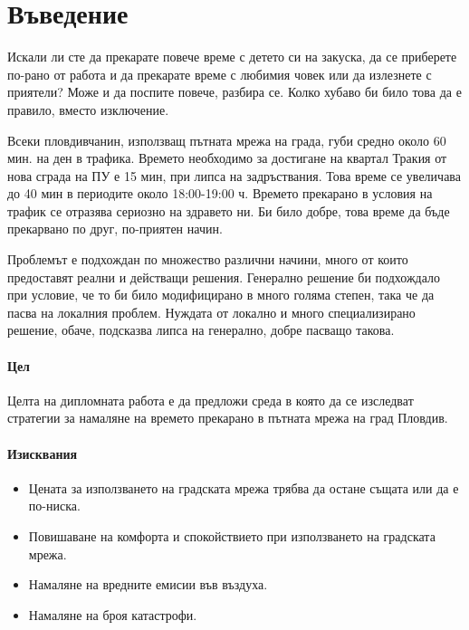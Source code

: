 \chapter*{Въведение}

	Искали ли сте да прекарате повече време с детето си на закуска, 
	да се приберете по-рано от работа и да прекарате време с любимия човек или да излезнете с приятели? 
	Може и да поспите повече, разбира се. Колко хубаво би било това да е правило, вместо изключение.
	
	Всеки пловдивчанин, използващ пътната мрежа на града, губи средно около 60 мин. на ден в трафика.
	Времето необходимо за достигане на квартал Тракия от нова сграда на ПУ е 15 мин, при липса на задръствания.
	Това време се увеличава до 40 мин в периодите около 18:00-19:00 ч.
	Времето прекарано в условия на трафик се отразява сериозно на здравето ни. \cite{HEI}
	Би било добре, това време да бъде прекарвано по друг, по-приятен начин.
	
	Проблемът е подхождан по множество различни начини, много от които предоставят реални и действащи решения.
	Генерално решение би подхождало при условие, че то би било модифицирано в много голяма степен, така че да пасва на локалния проблем.
	Нуждата от локално и много специализирано решение, обаче, подсказва липса на генерално, добре пасващо такова.

	\subsubsection{Цел}

	Целта на дипломната работа е да предложи среда в която да се изследват стратегии за намаляне на времето 
	прекарано в пътната мрежа на град Пловдив. 

	\subsubsection{Изисквания}

		\begin{itemize}
			\item Цената за използването на градската мрежа трябва да остане същата или да е по-ниска.
			\item Повишаване на комфорта и спокойствието при използването на градската мрежа.
			\item Намаляне на вредните емисии във въздуха.
			\item Намаляне на броя катастрофи.
		\end{itemize}

